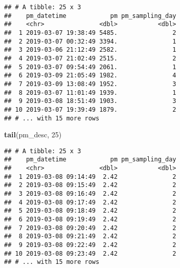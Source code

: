 \documentclass[
]{article}
\newenvironment{Shaded}{\begin{snugshade}}{\end{snugshade}}
\newcommand{\CommentTok}[1]{\textcolor[rgb]{0.56,0.35,0.01}{\textit{#1}}}
\newcommand{\DecValTok}[1]{\textcolor[rgb]{0.00,0.00,0.81}{#1}}
\newcommand{\KeywordTok}[1]{\textcolor[rgb]{0.13,0.29,0.53}{\textbf{#1}}}
\newcommand{\NormalTok}[1]{#1}
\newcommand{\OperatorTok}[1]{\textcolor[rgb]{0.81,0.36,0.00}{\textbf{#1}}}
\newcommand{\StringTok}[1]{\textcolor[rgb]{0.31,0.60,0.02}{#1}}
\begin{document}
\begin{verbatim}
## # A tibble: 25 x 3
##    pm_datetime            pm pm_sampling_day
##    <chr>               <dbl>           <dbl>
##  1 2019-03-07 19:38:49 5485.               2
##  2 2019-03-07 00:32:49 3394.               1
##  3 2019-03-06 21:12:49 2582.               1
##  4 2019-03-07 21:02:49 2515.               2
##  5 2019-03-07 09:54:49 2061.               1
##  6 2019-03-09 21:05:49 1982.               4
##  7 2019-03-09 13:08:49 1952.               3
##  8 2019-03-07 11:01:49 1939.               1
##  9 2019-03-08 18:51:49 1903.               3
## 10 2019-03-07 19:39:49 1879.               2
## # ... with 15 more rows
\end{verbatim}

\begin{Shaded}
\begin{Highlighting}[]
\KeywordTok{tail}\NormalTok{(pm_desc, }\DecValTok{25}\NormalTok{)}
\end{Highlighting}
\end{Shaded}

\begin{verbatim}
## # A tibble: 25 x 3
##    pm_datetime            pm pm_sampling_day
##    <chr>               <dbl>           <dbl>
##  1 2019-03-08 09:14:49  2.42               2
##  2 2019-03-08 09:15:49  2.42               2
##  3 2019-03-08 09:16:49  2.42               2
##  4 2019-03-08 09:17:49  2.42               2
##  5 2019-03-08 09:18:49  2.42               2
##  6 2019-03-08 09:19:49  2.42               2
##  7 2019-03-08 09:20:49  2.42               2
##  8 2019-03-08 09:21:49  2.42               2
##  9 2019-03-08 09:22:49  2.42               2
## 10 2019-03-08 09:23:49  2.42               2
## # ... with 15 more rows
\end{verbatim}

\begin{Shaded}
\end{Shaded}
\end{document}
